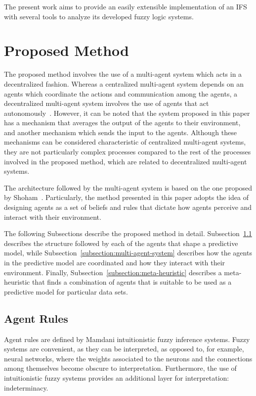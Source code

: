\documentclass[review]{elsarticle}
\begin{document}
The present work aims to provide an easily extensible implementation of an IFS
with several tools to analyze its developed fuzzy logic systems.

\section{Proposed Method}
\label{section:proposed-method}

The proposed method involves the use of a multi-agent system which acts in a
decentralized fashion. Whereas a centralized multi-agent system depends on an
agents which coordinate the actions and communication among the agents, a
decentralized multi-agent system involves the use of agents that act
autonomously~\cite{andreadis2014classification}. However, it can be noted that
the system proposed in this paper has a mechanism that averages the output of
the agents to their environment, and another mechanism which sends the input to
the agents. Although these mechanisms can be considered characteristic of
centralized multi-agent systems, they are not particularly complex processes
compared to the rest of the processes involved in the proposed method, which are
related to decentralized multi-agent systems.

The architecture followed by the multi-agent system is based on the one proposed
by Shoham~\cite{Shoham1993}. Particularly, the method presented in this paper
adopts the idea of designing agents as a set of beliefs and rules that dictate
how agents perceive and interact with their environment.

The following Subsections describe the proposed method in
detail. Subsection~\ref{subsection:agent-rules} describes the structure
followed by each of the agents that shape a predictive model, while
Subsection~\ref{subsection:multi-agent-system} describes how the agents in the
predictive model are coordinated and how they interact with their
environment. Finally, Subsection~\ref{subsection:meta-heuristic} describes a
meta-heuristic that finds a combination of agents that is suitable to be used
as a predictive model for particular data sets.

\subsection{Agent Rules}
\label{subsection:agent-rules}

Agent rules are defined by Mamdani intuitionistic fuzzy inference systems. Fuzzy systems
are convenient, as they can be interpreted, as opposed to, for example, neural
networks, where the weights associated to the neurons and the connections among
themselves become obscure to interpretation. Furthermore, the use of
intuitionistic fuzzy systems provides an additional layer for interpretation:
indeterminacy.
\end{document}
